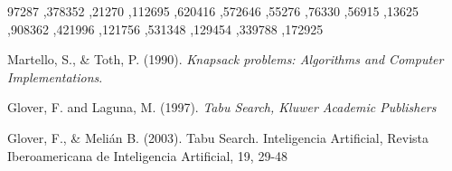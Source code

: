 \documentclass[spanish,12pt,letterpaper]{article}
\begin{document}
	97287 ,378352 ,21270 ,112695 ,620416 ,572646 ,55276 ,76330 ,56915 ,13625 ,908362 ,421996 ,121756 ,531348 ,129454 ,339788 ,172925
	
	\newpage
	\begin{thebibliography}{99}
		 Martello, S., \& Toth, P. (1990). \textit{Knapsack problems: Algorithms and Computer Implementations}.
		
		 Glover, F. and Laguna, M. (1997). \textit{Tabu Search, Kluwer Academic Publishers}
		
		 Glover, F., \& Melián
		 B. (2003). Tabu Search. Inteligencia Artificial, Revista Iberoamericana de Inteligencia Artificial, 19, 29-48
	\end{thebibliography}
	
\end{document}

